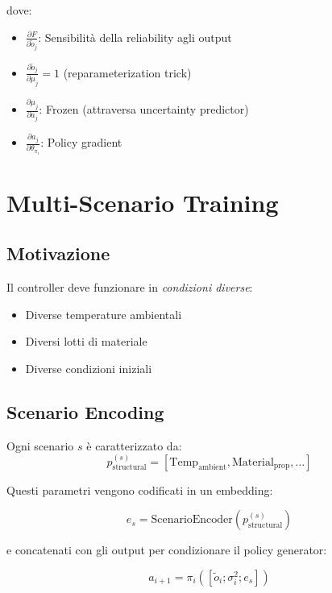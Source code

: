 \documentclass[11pt,a4paper]{article}
\begin{document}
dove:
\begin{itemize}
    \item $\frac{\partial F}{\partial \tilde{o}_j}$: Sensibilità della reliability agli output
    \item $\frac{\partial \tilde{o}_j}{\partial \mu_j} = 1$ (reparameterization trick)
    \item $\frac{\partial \mu_j}{\partial a_j}$: Frozen (attraversa uncertainty predictor)
    \item $\frac{\partial a_j}{\partial \theta_{\pi_i}}$: Policy gradient
\end{itemize}

\section{Multi-Scenario Training}

\subsection{Motivazione}

Il controller deve funzionare in \textit{condizioni diverse}:
\begin{itemize}
    \item Diverse temperature ambientali
    \item Diversi lotti di materiale
    \item Diverse condizioni iniziali
\end{itemize}

\subsection{Scenario Encoding}

Ogni scenario $s$ è caratterizzato da:
\begin{equation}
p_{\text{structural}}^{(s)} = [\text{Temp}_{\text{ambient}}, \text{Material}_{\text{prop}}, \ldots]
\end{equation}

Questi parametri vengono codificati in un embedding:

\begin{equation}
e_s = \text{ScenarioEncoder}(p_{\text{structural}}^{(s)})
\end{equation}

e concatenati con gli output per condizionare il policy generator:

\begin{equation}
a_{i+1} = \pi_i([\tilde{o}_i; \sigma_i^2; e_s])
\end{equation}
\end{document}
